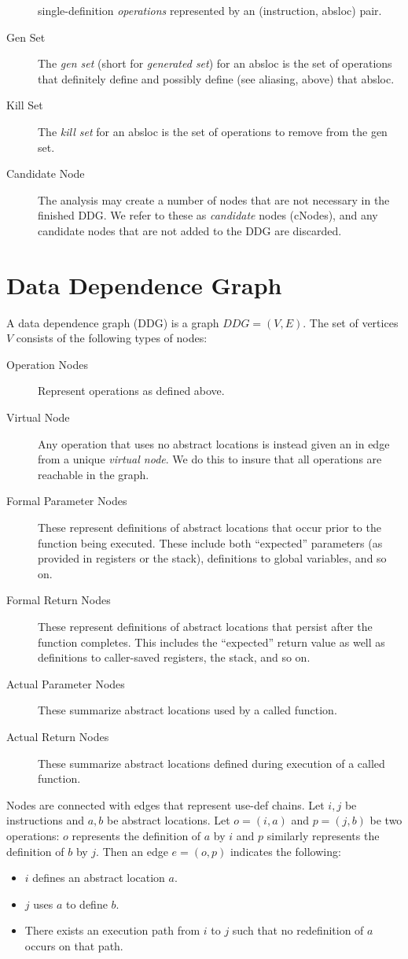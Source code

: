 \documentclass[11pt]{article}
\begin{document}
\begin{description}
  single-definition \emph{operations} represented by an (instruction,
  absloc) pair. 
\item[Gen Set] The \emph{gen set} (short for \emph{generated set}) for
  an absloc is the set of operations that definitely define and
  possibly define (see aliasing, above) that absloc.
\item[Kill Set] The \emph{kill set} for an absloc is the set of
  operations to remove from the gen set. 
\item[Candidate Node] The analysis may create a number of nodes that
  are not necessary in the finished DDG. We refer to these as
  \emph{candidate} nodes (cNodes), and any candidate nodes that are not added
  to the DDG are discarded. 
\end{description}

\section*{Data Dependence Graph}

A data dependence graph (DDG) is a graph $DDG = (V, E)$. The set of
vertices $V$ consists of the following types of nodes:
\begin{description}
\item[Operation Nodes] Represent operations as defined above.
\item[Virtual Node] Any operation that uses no abstract locations is
  instead given an in edge from a unique \emph{virtual node}. We do
  this to insure that all operations are reachable in the graph.
\item[Formal Parameter Nodes] These represent definitions of abstract
  locations that occur prior to the function being executed. These
  include both ``expected'' parameters (as provided in registers or
  the stack), definitions to global variables, and so on.
\item[Formal Return Nodes] These represent definitions of abstract
  locations that persist after the function completes. This includes
  the ``expected'' return value as well as definitions to caller-saved
  registers, the stack, and so on.
\item[Actual Parameter Nodes] These summarize abstract locations used
  by a called function.
\item[Actual Return Nodes] These summarize abstract locations defined
  during execution of a called function.
\end{description}

Nodes are connected with edges that represent use-def
chains. Let $i, j$ be instructions and $a, b$ be abstract
locations. Let $o = (i,a)$ and $p = (j,b)$ be two operations: $o$
represents the definition of $a$ by $i$ and $p$ similarly represents
the definition of $b$ by $j$. Then an edge $e = (o,p)$ indicates the following:
\begin{itemize}
\item $i$ defines an abstract location $a$.
\item $j$ uses $a$ to define $b$.
\item There exists an execution path from $i$ to $j$ such that no
  redefinition of $a$ occurs on that path.
\end{itemize}
\end{document}
